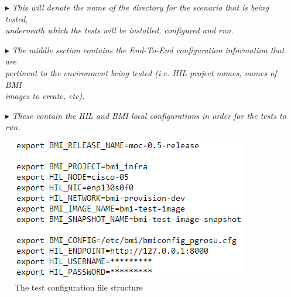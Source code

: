 \begin{itemize}
\item[\index{\code{BMI\_RELEASE\_NAME}}\code{BMI\_RELEASE\_NAME }$\blacktriangleright$\hspace{-12mm}] \hspace{10mm}\emph{This will denote the name of the directory for the scenario that is being tested, \\ \text{}\hspace{9mm} underneath which the tests will be installed, configured and run.} \\

\pagebreak

\item[\index{\code{E2E Test Configs}}\code{E2E Test Configs }$\blacktriangleright$\hspace{-12mm}] \hspace{10mm}\emph{The middle section contains the End-To-End configuration information that are\\ \text{}\hspace{9mm} pertinent to the environment being tested (i.e. HIL project names, names of BMI\\ \text{}\hspace{9mm} images to create, etc).} \\

\item[\index{\code{BMI and HIL Configurations}}\code{BMI and HIL Configs }$\blacktriangleright$\hspace{-12mm}] \hspace{10mm}\emph{These contain the HIL and BMI local configurations in order for the tests to run.} 

\end{itemize}

\begin{figure}[!h] %
\vspace{10mm}
\begin{center}
\includegraphics[scale=1]{figures/uat-config-file.png}
\end{center}
\caption{The test configuration file structure}
\label{fig:uat-config-file}
\end{figure}

